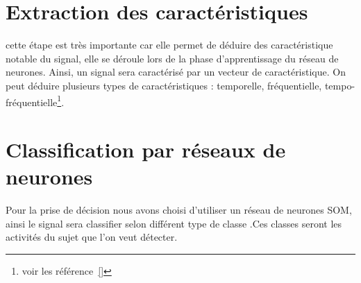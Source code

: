 	\section{Extraction des caractéristiques} %
	\label{sec:extraction_des_caractéristiques}
	cette étape est très importante car elle permet de déduire des caractéristique notable du signal, elle se déroule lors de la phase d'apprentissage du réseau de neurones. Ainsi, un signal sera caractérisé par un vecteur de caractéristique. On peut déduire plusieurs types de caractéristiques : temporelle, fréquentielle, tempo-fréquentielle\footnote{voir les référence~\ref{}}.

	\section{Classification par réseaux de neurones} %
	\label{sec:classification_par_réseaux_de_neurones}
	Pour la prise de décision nous avons choisi d'utiliser un réseau de neurones SOM, ainsi le signal sera classifier selon différent type de classe .Ces classes seront les activités du sujet que l'on veut détecter. 
